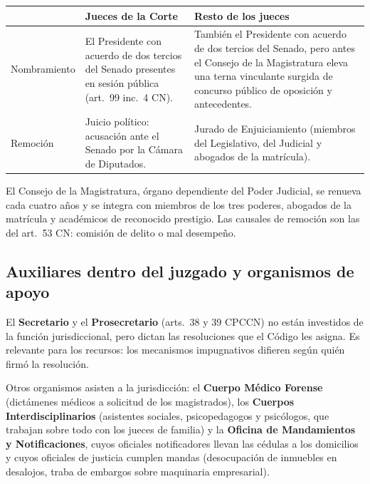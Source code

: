 \documentclass[12pt,oneside]{book}
\renewcommand{\arraystretch}{1.15}
\begin{document}
\begin{table}[H]
\centering
\renewcommand{\arraystretch}{1.25}
\begin{tabularx}{\textwidth}{>{\RaggedRight\arraybackslash}p{}>{\RaggedRight\arraybackslash}X>{\RaggedRight\arraybackslash}X}
\toprule
 & \textbf{Jueces de la Corte} & \textbf{Resto de los jueces} \\
\midrule
Nombramiento & El Presidente con acuerdo de dos tercios del Senado presentes en sesión pública (art.~99 inc.~4 CN). & También el Presidente con acuerdo de dos tercios del Senado, pero antes el Consejo de la Magistratura eleva una terna vinculante surgida de concurso público de oposición y antecedentes. \\
\addlinespace
Remoción & Juicio político: acusación ante el Senado por la Cámara de Diputados. & Jurado de Enjuiciamiento (miembros del Legislativo, del Judicial y abogados de la matrícula). \\
\bottomrule
\end{tabularx}
\end{table}

El Consejo de la Magistratura, órgano dependiente del Poder Judicial, se renueva cada cuatro años y se integra con miembros de los tres poderes, abogados de la matrícula y académicos de reconocido prestigio. Las causales de remoción son las del art.~53 CN: comisión de delito o mal desempeño.

\subsection{Auxiliares dentro del juzgado y organismos de apoyo}

El \textbf{Secretario} y el \textbf{Prosecretario} (arts.~38 y 39 CPCCN) no están investidos de la función jurisdiccional, pero dictan las resoluciones que el Código les asigna. Es relevante para los recursos: los mecanismos impugnativos difieren según quién firmó la resolución.

Otros organismos asisten a la jurisdicción: el \textbf{Cuerpo Médico Forense} (dictámenes médicos a solicitud de los magistrados), los \textbf{Cuerpos Interdisciplinarios} (asistentes sociales, psicopedagogos y psicólogos, que trabajan sobre todo con los jueces de familia) y la \textbf{Oficina de Mandamientos y Notificaciones}, cuyos oficiales notificadores llevan las cédulas a los domicilios y cuyos oficiales de justicia cumplen mandas (desocupación de inmuebles en desalojos, traba de embargos sobre maquinaria empresarial).
\end{document}
